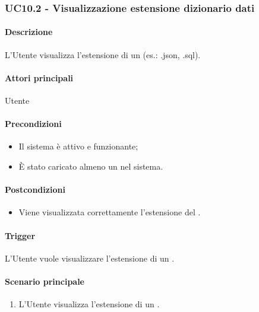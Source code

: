 
\subsubsection{UC10.2 - Visualizzazione estensione dizionario dati}\label{UC10point2}
\paragraph*{Descrizione}
L'Utente visualizza l'estensione di un  (es.: .json, .sql).

\paragraph*{Attori principali}
Utente

\paragraph*{Precondizioni}
\begin{itemize}
  \item Il sistema è attivo e funzionante;
  \item È stato caricato almeno un  nel sistema. 
\end{itemize}

\paragraph*{Postcondizioni}
\begin{itemize}
  \item Viene visualizzata correttamente l'estensione del .
\end{itemize}

\paragraph*{Trigger}
L'Utente vuole visualizzare l'estensione di un .

\paragraph*{Scenario principale}
\begin{enumerate}
  \item L'Utente visualizza l'estensione di un .
\end{enumerate}

